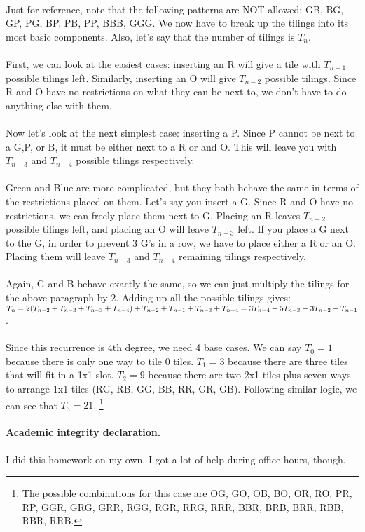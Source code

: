 \documentclass[11pt]{article}
\begin{document}
\begin{solution}
	\\   Just for reference, note that the following patterns are NOT allowed: GB, BG, GP, PG, BP, PB, PP, BBB, GGG. We now have to break up the tilings into its most basic components. Also, let's say that the number of tilings is $T_n$. 
	\\\\ First, we can look at the easiest cases: inserting an R will give a tile with $T_{n-1}$ possible tilings left. Similarly, inserting an O will give $T_{n-2}$ possible tilings. Since R and O have no restrictions on what they can be next to, we don't have to do anything else with them. 
	\\\\ Now let's look at the next simplest case: inserting a P. Since P cannot be next to a G,P, or B, it must be either next to a R or and O. This will leave you with $T_{n-3}$ and $T_{n-4}$ possible tilings respectively. 
	\\\\ Green and Blue are more complicated, but they both behave the same in terms of the restrictions placed on them. Let's say you insert a G. Since R and O have no restrictions, we can freely place them next to G. Placing an R leaves $T_{n-2}$ possible tilings left, and placing an O will leave $T_{n-3}$ left. If you place a G next to the G, in order to prevent 3 G's in a row, we have to place either a R or an O. Placing them will leave $T_{n-3}$ and $T_{n-4}$ remaining tilings respectively. 
	\\\\ Again, G and B behave exactly the same, so we can just multiply the tilings for the above paragraph by 2. Adding up all the possible tilings gives: \\ $T_n = 2(T_{n-2} + T_{n-3} + T_{n-3} + T_{n-4}) + T_{n-2} + T_{n-1} + T_{n-3} + T_{n-4} \\ =  3T_{n-4} + 5T_{n-3} + 3T_{n-2} + T_{n-1}$.
	\\\\ Since this recurrence is 4th degree, we need 4 base cases. We can say $T_0 = 1$ because there is only one way to tile 0 tiles. $T_1 = 3$ because there are three tiles that will fit in a 1x1 slot. $T_2 = 9$ because there are two 2x1 tiles plus seven ways to arrange 1x1 tiles (RG, RB, GG, BB, RR, GR, GB). Following similar logic, we can see that $T_3 = 21$. \footnote[1]{The possible combinations for this case are OG, GO, OB, BO, OR, RO, PR, RP, GGR, GRG, GRR, RGG, RGR, RRG, RRR, BBR, BRB, BRR, RBB, RBR, RRB.}
\end{solution}

\newpage
\vskip 0.1in

\paragraph{Academic integrity declaration.}
I did this homework on my own. I got a lot of help during office hours, though.
\end{document}
